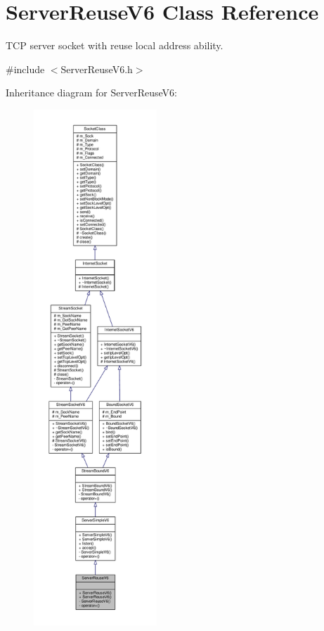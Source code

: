 \hypertarget{classServerReuseV6}{}\section{Server\+Reuse\+V6 Class Reference}
\label{classServerReuseV6}


T\+CP server socket with reuse local address ability.  




{\ttfamily \#include $<$Server\+Reuse\+V6.\+h$>$}



Inheritance diagram for Server\+Reuse\+V6\+:\nopagebreak
\begin{figure}[H]
\begin{center}
\leavevmode
\includegraphics[height=550pt]{classServerReuseV6__inherit__graph}
\end{center}
\end{figure}
